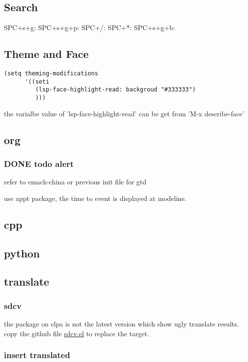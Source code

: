 \documentclass[11pt]{article}
\begin{document}
\subsection{Search}
\label{sec:orgc3be053}
SPC+s+g:
SPC+s+g+p:
SPC+/:
SPC+*:
SPC+s+g+b:
\subsection{Theme and Face}
\label{sec:org6a00c2b}
\begin{verbatim}
(setq theming-modifications
      '((seti
         (lsp-face-highlight-read: backgroud "#333333")
         )))
\end{verbatim}
the varialbe value of 'lsp-face-highlight-read' can be get from 'M-x describe-face'
\subsection{org}
\label{sec:org1413011}
\subsubsection{{\bfseries\sffamily DONE} todo alert}
\label{sec:org5d93079}
refer to emach-china or previous init file for gtd

use appt package, the time to event is displayed at modeline.

\subsection{cpp}
\label{sec:orgf6d1c82}
\subsection{python}
\label{sec:orgc4881fd}
\subsection{translate}
\label{sec:orge4eae84}
\subsubsection{sdcv}
\label{sec:org6b4b537}
the package on elpa is not the latest version which show ugly translate results.
copy the github file \href{https://raw.githubusercontent.com/manateelazycat/sdcv/master/sdcv.el}{sdcv.el} to replace the target.
\subsubsection{insert translated}
\label{sec:org3b2fbcd}
\end{document}
